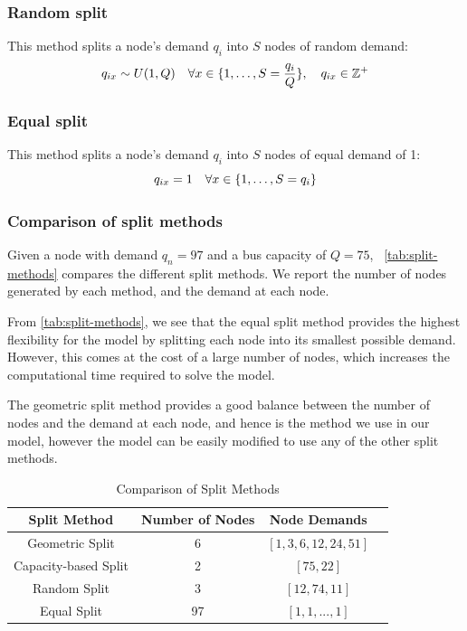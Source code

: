 \documentclass[12pt]{article}
\begin{document}
\subsubsection{Random split}
This method splits a node's demand $q_i$ into $S$ nodes of random demand:
\begin{equation}
    q_{ix} \sim U(1, Q) \quad \forall x \in \{1, \dots, S = \frac{q_{i}}{Q}\}, \quad q_{ix} \in \mathbb{Z}^+\\
\end{equation}

\subsubsection{Equal split}
This method splits a node's demand $q_i$ into $S$ nodes of equal demand of 1:
\begin{equation}
    q_{ix} = 1 \quad \forall x \in \{1, \dots, S = q_{i}\} \\
\end{equation}

\subsubsection{Comparison of split methods}
Given a node with demand $q_n = 97$ and a bus capacity of $Q = 75$, ~\autoref{tab:split-methods} compares the different split methods.
We report the number of nodes generated by each method, and the demand at each node.

From \autoref{tab:split-methods}, we see that the equal split method provides the highest flexibility for the model by splitting each node into its smallest possible demand. However, this comes at the cost of a large number of nodes, which increases the computational time required to solve the model.

The geometric split method provides a good balance between the number of nodes and the demand at each node, and hence is the method we use in our model, however the model can be easily modified to use any of the other split methods.

\begin{table}[htbp]
    \centering
    \begin{tabular}{|c|c|c|c|}
        \hline
        \textbf{Split Method} & \textbf{Number of Nodes} & \textbf{Node Demands}   \\
        \hline
        Geometric Split       & 6                        & $[1, 3, 6, 12, 24, 51]$ \\
        \hline
        Capacity-based Split  & 2                        & $[75, 22]$              \\
        \hline
        Random Split          & 3                        & $[12, 74, 11]$          \\
        \hline
        Equal Split           & 97                       & $[1, 1, ..., 1]$        \\
        \hline
    \end{tabular}
    \caption{Comparison of Split Methods}
    \label{tab:split-methods}
\end{table}
\end{document}
